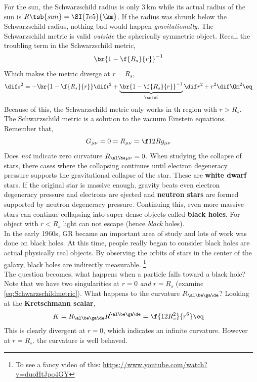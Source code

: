 \documentclass{article}
\begin{document}
For the sun, the Schwarzschild radius is only $\SI{3}{\km}$ while its actual radius of the sun is $R\tsb{sun} = \SI{7e5}{\km}$. If the radius was shrunk below the Schwarzschild radius, nothing bad would happen \textit{gravitationally}. The Schwarzschild metric is valid \textit{outside} the spherically symmetric object. Recall the troubling term in the Schwarzschild metric,
\[ \br{1 - \f{R_s}{r}}^{-1} \]
Which makes the metric diverge at $r = R_s$,
\[ \dif s^2 = -\br{1 - \f{R_s}{r}} \dif t^2 + \underbrace{\br{1 - \f{R_s}{r}}^{-1}}_{\ar \inf } \dif r^2 + r^2 \dif \Om^2 \eq \label{eq:Schwarzschildmetric} \]
Because of this, the Schwarzschild metric only works in th region with $r > R_s$. The Schwarzschild metric is a solution to the vacuum Einstein equations. Remember that,
\[ G_{\mu\nu} = 0 = R_{\mu\nu} = \f12 R g_{\mu\nu} \]
Does \textit{not} indicate zero curvature $R_{\al\be\mu\nu} = 0$. When studying the collapse of stars, there cases where the collapsing continues until electron degeneracy pressure supports the gravitational collapse of the star. These are \textbf{white dwarf} stars. If the original star is massive enough, gravity beats even electron degeneracy pressure and electrons are ejected and \textbf{neutron stars} are formed supported by neutron degeneracy pressure. Continuing this, even more massive stars can continue collapsing into super dense objects called \textbf{black holes}. For object with $r < R_s$ light can not escape (hence \textit{black} holes). \\

In the early 1960s, GR became an important area of study and lots of work was done on black holes. At this time, people really began to consider black holes are actual physically real objects. By observing the orbits of stars in the center of the galaxy, black holes are indirectly measurable. \footnote{To see a fancy video of this: \url{https://www.youtube.com/watch?v=duoHtJpo4GY}} \\

The question becomes, what happens when a particle falls toward a black hole? Note that we have two singularities at $r = 0$ \textit{and} $r = R_s$ (examine \eqref{eq:Schwarzschildmetric}). What happens to the curvature $R_{\al\be\ga\de}$? Looking at the \textbf{Kretschmann scalar},
\[ K = R_{\al\be\ga\de}R^{\al\be\ga\de} = \f{12R_s^2}{r^6} \eq \label{eq:KretschmannScalar} \]
This is clearly divergent at $r = 0$, which indicates an infinite curvature. However at $r = R_s$, the curvature is well behaved.
\end{document}
